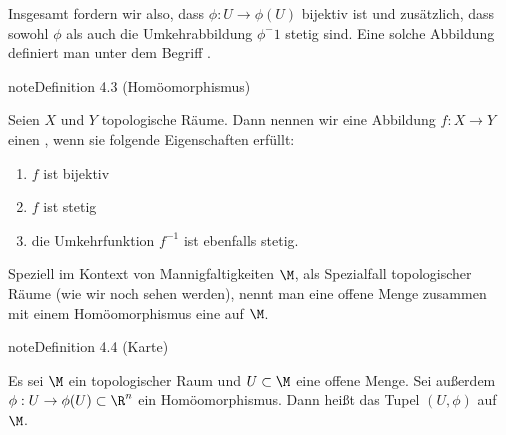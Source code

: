 \documentclass[letterpaper,10pt,german]{jupyterBook}
\begin{document}
\sphinxAtStartPar
Insgesamt fordern wir also, dass \(\phi:U\rightarrow\phi(U)\) bijektiv ist und zusätzlich, dass sowohl \(\phi\) als auch die Umkehrabbildung \(\phi^-1\) stetig sind.
Eine solche Abbildung definiert man unter dem Begriff .
\label{manifolds/manifolds_prelim:definition-5}
\begin{sphinxadmonition}{note}{Definition 4.3 (Homöomorphismus)}



\sphinxAtStartPar
Seien \(X\) und \(Y\) topologische Räume.
Dann nennen wir eine Abbildung \(f \colon X \rightarrow Y\) einen , wenn sie folgende Eigenschaften erfüllt:
\begin{enumerate}
%
\item {} 
\sphinxAtStartPar
\(f\) ist bijektiv

\item {} 
\sphinxAtStartPar
\(f\) ist stetig

\item {} 
\sphinxAtStartPar
die Umkehrfunktion \(f^{-1}\) ist ebenfalls stetig.

\end{enumerate}
\end{sphinxadmonition}

\sphinxAtStartPar
Speziell im Kontext von Mannigfaltigkeiten \(\M\), als Spezialfall topologischer Räume (wie wir noch sehen werden), nennt man eine offene Menge zusammen mit einem Homöomorphismus eine  auf \(\M\).
\label{manifolds/manifolds_prelim:definition-6}
\begin{sphinxadmonition}{note}{Definition 4.4 (Karte)}



\sphinxAtStartPar
Es sei \(\M\) ein topologischer Raum und \(U\subset\M\) eine offene Menge.
Sei außerdem \(\phi:U\rightarrow \phi(U)\subset \R^n\) ein Homöomorphismus.
Dann heißt das Tupel \((U,\phi)\)  auf \(\M\).
\end{sphinxadmonition}
\end{document}
